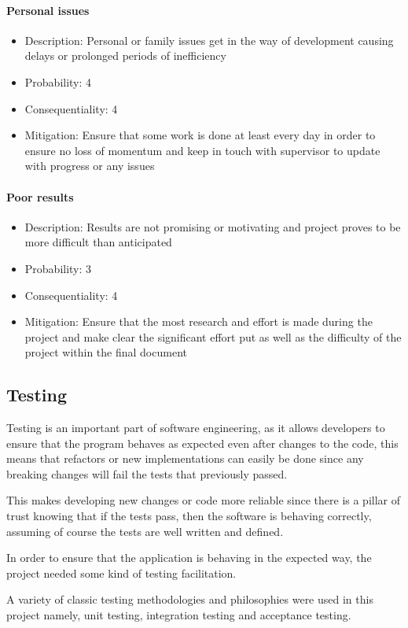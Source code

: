 \documentclass[12pt]{article}
\newcommand{\sentence}{} %
\begin{document}
    \paragraph{Personal issues}
    \begin{itemize}
        \item Description: Personal or family issues get in the way of development causing delays or prolonged
        periods of inefficiency
        \item Probability: 4
        \item Consequentiality: 4
        \item Mitigation: Ensure that some work is done at least every day in order to ensure no loss of momentum and
        keep in touch with supervisor to update with progress or any issues
    \end{itemize}

    \paragraph{Poor results}
    \begin{itemize}
        \item Description: Results are not promising or motivating and project proves to be more difficult than
        anticipated
        \item Probability: 3
        \item Consequentiality: 4
        \item Mitigation: Ensure that the most research and effort is made during the project and make clear the
        significant effort put as well as the difficulty of the project within the final document
    \end{itemize}

    \subsection{Testing}\label{subsec:testing}

    \tab
    Testing is an important part of software engineering, as it allows developers to ensure that the program behaves
    as expected even after changes to the code, this means that refactors or new implementations can easily be done
    since any breaking changes will fail the tests that previously passed.
    \sentence
    This makes developing new changes or code more reliable since there is a pillar of trust knowing that if the
    tests pass, then the software is behaving correctly, assuming of course the tests are well written and defined.
    \sentence
    In order to ensure that the application is behaving in the expected way, the project needed some kind of
    testing facilitation.
    \sentence
    A variety of classic testing methodologies and philosophies were used in this project namely, unit testing,
    integration testing and acceptance testing.
\end{document}
